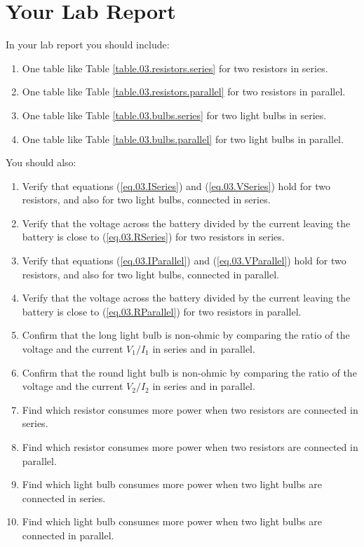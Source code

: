 \section{Your Lab Report}
In your lab report you should include:
\begin{enumerate}
	\item One table like Table \ref{table.03.resistors.series} for two resistors in series.
	\item One table like Table \ref{table.03.resistors.parallel} for two resistors in parallel.
	\item One table like Table \ref{table.03.bulbs.series} for two light bulbs in series.
	\item One table like Table \ref{table.03.bulbs.parallel} for two light bulbs in parallel.
\end{enumerate}
You should also:
\begin{enumerate}
	\item Verify that equations (\ref{eq.03.ISeries}) and (\ref{eq.03.VSeries}) hold for two resistors, and also for two light bulbs, connected in series.
	\item Verify that the voltage across the battery divided by the current leaving the battery is close to (\ref{eq.03.RSeries}) for two resistors in series.
	\item Verify that equations (\ref{eq.03.IParallel}) and (\ref{eq.03.VParallel}) hold for two resistors, and also for two light bulbs, connected in parallel.
	\item Verify that the voltage across the battery divided by the current leaving the battery is close to (\ref{eq.03.RParallel}) for two resistors in parallel.
	\item Confirm that the long light bulb is non-ohmic by comparing the ratio of the voltage and the current $V_{1} / I_{1}$ in series and in parallel.
	\item Confirm that the round light bulb is non-ohmic by comparing the ratio of the voltage and the current $V_{2} / I_{2}$ in series and in parallel.
	\item Find which resistor consumes more power when two resistors are connected in series.
	\item Find which resistor consumes more power when two resistors are connected in parallel.
	\item Find which light bulb consumes more power when two light bulbs are connected in series.
	\item Find which light bulb consumes more power when two light bulbs are connected in parallel.
\end{enumerate}
\newpage
